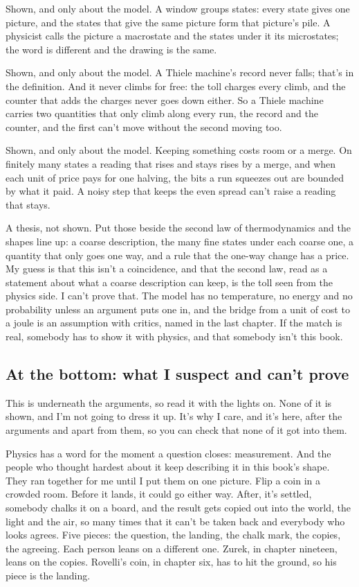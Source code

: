 \documentclass[11pt,twoside]{article}
\theoremstyle{thielethm}
\theoremstyle{thieledef}
\theoremstyle{thieledef}
\theoremstyle{thieledef}
\theoremstyle{thielethm}
\theoremstyle{thieleobs}
\theoremstyle{thielethm}
\begin{document}
Shown, and only about the model. A window groups states: every state gives one picture, and the states that give the same picture form that picture's pile. A physicist calls the picture a macrostate and the states under it its microstates; the word is different and the drawing is the same.

Shown, and only about the model. A Thiele machine's record never falls; that's in the definition. And it never climbs for free: the toll charges every climb, and the counter that adds the charges never goes down either. So a Thiele machine carries two quantities that only climb along every run, the record and the counter, and the first can't move without the second moving too.

Shown, and only about the model. Keeping something costs room or a merge. On finitely many states a reading that rises and stays rises by a merge, and when each unit of price pays for one halving, the bits a run squeezes out are bounded by what it paid. A noisy step that keeps the even spread can't raise a reading that stays.

A thesis, not shown. Put those beside the second law of thermodynamics and the shapes line up: a coarse description, the many fine states under each coarse one, a quantity that only goes one way, and a rule that the one-way change has a price. My guess is that this isn't a coincidence, and that the second law, read as a statement about what a coarse description can keep, is the toll seen from the physics side. I can't prove that. The model has no temperature, no energy and no probability unless an argument puts one in, and the bridge from a unit of cost to a joule is an assumption with critics, named in the last chapter. If the match is real, somebody has to show it with physics, and that somebody isn't this book.

\subsection{At the bottom: what I suspect and can't prove}

This is underneath the arguments, so read it with the lights on. None of it is shown, and I'm not going to dress it up. It's why I care, and it's here, after the arguments and apart from them, so you can check that none of it got into them.

Physics has a word for the moment a question closes: measurement. And the people who thought hardest about it keep describing it in this book's shape. They ran together for me until I put them on one picture. Flip a coin in a crowded room. Before it lands, it could go either way. After, it's settled, somebody chalks it on a board, and the result gets copied out into the world, the light and the air, so many times that it can't be taken back and everybody who looks agrees. Five pieces: the question, the landing, the chalk mark, the copies, the agreeing. Each person leans on a different one. Zurek, in chapter nineteen, leans on the copies. Rovelli's coin, in chapter six, has to hit the ground, so his piece is the landing.
\end{document}
